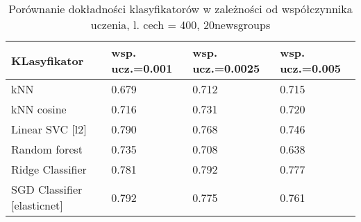 \documentclass{pracamgr}
\begin{document}
\begin{table}[]
\centering
{}
\caption{Najlepsze wyniki pod względem dokładności, metoda gradientowa, 20newsgroups}
\label{iterf1-20newsgroups}
\end{table}

\begin{table}[]
\centering
\begin{tabular}{@{}llll@{}}
\toprule
KLasyfikator                             & wsp. ucz.=0.001 & wsp. ucz.=0.0025 & wsp. ucz.=0.005 \\ \midrule
kNN                             & 0.679          & 0.712           & 0.715          \\
kNN cosine                      & 0.716          & 0.731           & 0.720          \\
Linear SVC {[}l2{]}             & 0.790          & 0.768           & 0.746          \\
Random forest                   & 0.735          & 0.708           & 0.638          \\
Ridge Classifier                & 0.781          & 0.792           & 0.777          \\
SGD Classifier {[}elasticnet{]} & 0.792          & 0.775           & 0.761          \\ \bottomrule
\end{tabular}
\caption{Porównanie dokładności klasyfikatorów w zależności od współczynnika uczenia, l. cech = 400, 20newsgroups}
\label{news_learn_r}
\end{table}
\end{document}
